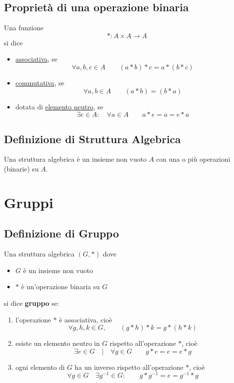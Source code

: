 \documentclass[a4paper,12pt, oneside]{book}
\begin{document}
		\subsection{Proprietà di una operazione \textbf{binaria}}
			Una funzione
			$$* : A \times A \longrightarrow A$$
			si dice \begin{itemize}
				\item \underline{associativa}, se $$\forall a,b,c \in A \qquad (a*b)*c = a*(b*c)$$
				\item \underline{commutativa}, se $$\forall a,b \in A \qquad (a*b) = (b*a)$$
				\item dotata di \underline{elemento neutro}, se $$\exists e \in A: \quad \forall a \in A \qquad a*e=a=e*a$$
			\end{itemize}
		\subsection{Definizione di Struttura Algebrica}
			\begin{definizione}
				Una struttura algebrica è un insieme non vuoto $A$ con una o più operazioni (binarie) su $A$.
			\end{definizione}
		
	\section{Gruppi}
		\subsection{Definizione di Gruppo}
			\begin{definizione}
				Una struttura algebrica $(G, *)$
				dove \begin{itemize}
					\item $G$ è un insieme non vuoto
					\item $*$ è un'operazione binaria su $G$
				\end{itemize}
				si dice \textbf{gruppo} se:
				\begin{enumerate}
					\item l'operazione $*$ è associativa, cioè $$\forall g,h,k \in G, \qquad (g*h)*k=g*(h*k)$$
					\item esiste un elemento neutro in $G$ rispetto all'operazione $*$, cioè $$\exists e \in G \quad | \quad \forall g \in G \qquad g*e=e=e*g$$
					\item ogni elemento di $G$ ha un inverso rispetto all'operazione $*$, cioè $$\forall g \in G \quad \exists g^{-1} \in G: \qquad g*g^{-1}=e=g^{-1}*g$$
				\end{enumerate}
			\end{definizione}
			
\end{document}
